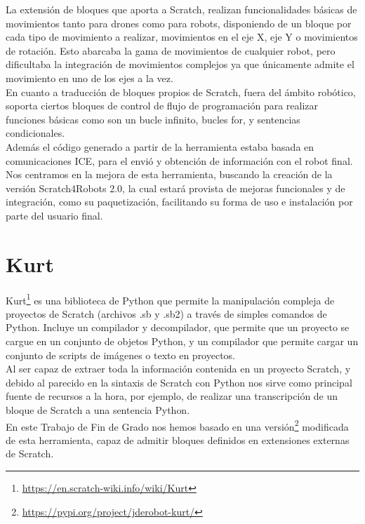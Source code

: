 La extensión de bloques que aporta a Scratch, realizan funcionalidades básicas de movimientos tanto para drones como para robots, disponiendo de un bloque por cada tipo de movimiento a realizar, movimientos en el eje X, eje Y o movimientos de rotación. Esto abarcaba la gama de movimientos de cualquier robot, pero dificultaba la integración de movimientos complejos ya que únicamente admite el movimiento en uno de los ejes a la vez.\\

En cuanto a traducción de bloques propios de Scratch, fuera del ámbito robótico, soporta ciertos bloques de control de flujo de programación para realizar funciones básicas como son un bucle infinito, bucles for, y sentencias condicionales.\\

Además el código generado a partir de la herramienta estaba basada en comunicaciones ICE, para el envió y obtención de información con el robot final.\\

Nos centramos en la mejora de esta herramienta, buscando la creación de la versión Scratch4Robots 2.0, la cual estará provista de mejoras funcionales y de integración, como su paquetización, facilitando su forma de uso e instalación por parte del usuario final.

\section{Kurt}
\label{sec:kurt}
Kurt\footnote{\url{https://en.scratch-wiki.info/wiki/Kurt}} es una biblioteca de Python que permite la manipulación compleja de proyectos de Scratch (archivos .sb y .sb2) a través de simples comandos de Python. Incluye un compilador y decompilador, que permite que un proyecto se cargue en un conjunto de objetos Python, y un compilador que permite cargar un conjunto de scripts de imágenes o texto en proyectos.\\

Al ser capaz de extraer toda la información contenida en un proyecto Scratch, y debido al parecido en la sintaxis de Scratch con Python nos sirve como principal fuente de recursos a la hora, por ejemplo, de realizar una transcripción de un bloque de Scratch a una sentencia Python.\\

En este Trabajo de Fin de Grado nos hemos basado en una versión\footnote{\url{https://pypi.org/project/jderobot-kurt/}} modificada de esta herramienta, capaz de admitir bloques definidos en extensiones externas de Scratch.\\

